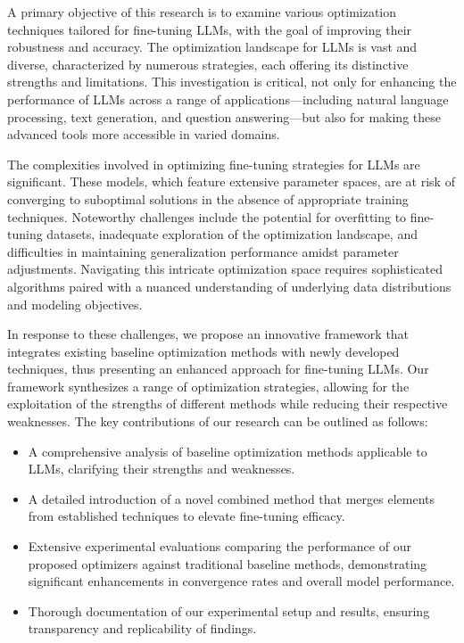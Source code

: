 \documentclass{article} %
\begin{document}
A primary objective of this research is to examine various optimization techniques tailored for fine-tuning LLMs, with the goal of improving their robustness and accuracy. The optimization landscape for LLMs is vast and diverse, characterized by numerous strategies, each offering its distinctive strengths and limitations. This investigation is critical, not only for enhancing the performance of LLMs across a range of applications—including natural language processing, text generation, and question answering—but also for making these advanced tools more accessible in varied domains.

The complexities involved in optimizing fine-tuning strategies for LLMs are significant. These models, which feature extensive parameter spaces, are at risk of converging to suboptimal solutions in the absence of appropriate training techniques. Noteworthy challenges include the potential for overfitting to fine-tuning datasets, inadequate exploration of the optimization landscape, and difficulties in maintaining generalization performance amidst parameter adjustments. Navigating this intricate optimization space requires sophisticated algorithms paired with a nuanced understanding of underlying data distributions and modeling objectives.

In response to these challenges, we propose an innovative framework that integrates existing baseline optimization methods with newly developed techniques, thus presenting an enhanced approach for fine-tuning LLMs. Our framework synthesizes a range of optimization strategies, allowing for the exploitation of the strengths of different methods while reducing their respective weaknesses. The key contributions of our research can be outlined as follows:

\begin{itemize}
    \item A comprehensive analysis of baseline optimization methods applicable to LLMs, clarifying their strengths and weaknesses.
    \item A detailed introduction of a novel combined method that merges elements from established techniques to elevate fine-tuning efficacy.
    \item Extensive experimental evaluations comparing the performance of our proposed optimizers against traditional baseline methods, demonstrating significant enhancements in convergence rates and overall model performance.
    \item Thorough documentation of our experimental setup and results, ensuring transparency and replicability of findings.
\end{itemize}
\end{document}
